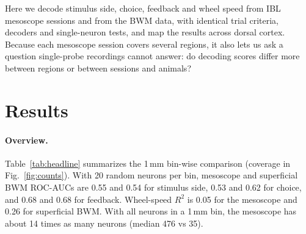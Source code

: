 \documentclass[10pt]{article}
\newcommand{\figref}[1]{Fig.~\ref{fig:#1}}
\begin{document}
Here we decode stimulus side, choice, feedback and wheel speed from IBL mesoscope sessions and from the BWM data, with identical trial criteria, decoders and single-neuron tests, and map the results across dorsal cortex. Because each mesoscope session covers several regions, it also lets us ask a question single-probe recordings cannot answer: do decoding scores differ more between regions or between sessions and animals?

\FloatBarrier
\section*{Results}
\paragraph{Overview.} Table~\ref{tab:headline} summarizes the 1\,mm bin-wise comparison (coverage in \figref{counts}). With 20 random neurons per bin, mesoscope and superficial BWM ROC-AUCs are 0.55 and 0.54 for stimulus side, 0.53 and 0.62 for choice, and 0.68 and 0.68 for feedback. Wheel-speed $R^2$ is 0.05 for the mesoscope and 0.26 for superficial BWM. With all neurons in a 1\,mm bin, the mesoscope has about 14 times as many neurons (median 476 vs 35).
\end{document}
